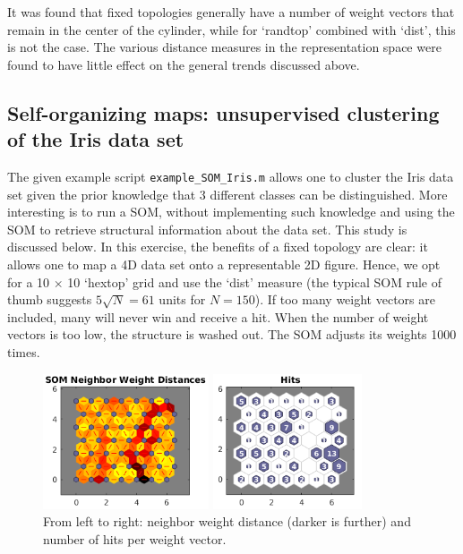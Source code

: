 \documentclass[pdftex,11pt,a4paper]{article}
\begin{document}
It was found that fixed topologies generally have a number of weight vectors that remain in the center of the cylinder, while for `randtop' combined with `dist', this is not the case. The various distance measures in the representation space were found to have little effect on the general trends discussed above.

\subsection{Self-organizing maps: unsupervised clustering of the Iris data set}
The given example script \texttt{example\_SOM\_Iris.m} allows one to cluster the Iris data set given the prior knowledge that 3 different classes can be distinguished. More interesting is to run a SOM, without implementing such knowledge and using the SOM to retrieve structural information about the data set. This study is discussed below.
In this exercise, the benefits of a fixed topology are clear: it allows one to map a 4D data set onto a representable 2D figure. Hence, we opt for a 10 $\times$ 10 `hextop' grid and use the `dist' measure (the typical SOM rule of thumb suggests $5 \sqrt{N} = 61$ units for $N=150$). If too many weight vectors are included, many will never win and receive a hit. When the number of weight vectors is too low, the structure is washed out. The SOM adjusts its weights 1000 times. 

\begin{figure}[htb]
\centering
\begin{minipage}{0.40\textwidth}
\includegraphics[height=4cm]{figs/som_distances.png}
\end{minipage}%
\begin{minipage}{0.40\textwidth}
\includegraphics[height=4cm]{figs/som_hits.png}
\end{minipage}%
\caption{From left to right: neighbor weight distance (darker is further) and number of hits per weight vector.\label{fig:som_figs}}
\end{figure}
\end{document}
